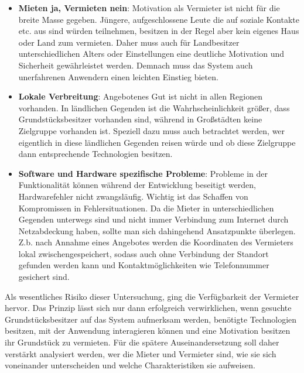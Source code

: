 \begin{itemize}
   \item
   \textbf{Mieten ja, Vermieten nein}: Motivation als Vermieter ist nicht für die breite Masse gegeben. Jüngere, aufgeschlossene Leute die auf soziale Kontakte etc. aus sind würden teilnehmen, besitzen in der Regel aber kein eigenes Haus oder Land zum vermieten. Daher muss auch für Landbesitzer unterschiedlichen Alters oder Einstellungen eine deutliche Motivation und Sicherheit gewährleistet werden. Demnach muss das System auch unerfahrenen Anwendern einen leichten Einstieg bieten.

   \item
   \textbf{Lokale Verbreitung}: Angebotenes Gut ist nicht in allen Regionen vorhanden. In ländlichen Gegenden ist die Wahrhscheinlichkeit größer, dass Grundstücksbesitzer vorhanden sind, während in Großstädten keine Zielgruppe vorhanden ist. Speziell dazu muss auch betrachtet werden, wer eigentlich in diese ländlichen Gegenden reisen würde und ob diese Zielgruppe dann entsprechende Technologien besitzen.

   \item
   \textbf{Software und Hardware spezifische Probleme}:
   Probleme in der Funktionalität können während der Entwicklung beseitigt werden, Hardwarefehler nicht zwangsläufig. Wichtig ist das Schaffen von Kompromissen in Fehlersituationen. 
   Da die Mieter in unterschiedlichen Gegenden unterwegs sind und nicht immer Verbindung zum Internet durch Netzabdeckung haben, sollte man sich dahingehend Ansatzpunkte überlegen. Z.b. nach Annahme eines Angebotes werden die Koordinaten des Vermieters lokal zwischengespeichert, sodass auch ohne Verbindung der Standort gefunden werden kann und Kontaktmöglichkeiten wie Telefonnummer gesichert sind.    
\end{itemize}

Als wesentliches Risiko dieser Untersuchung, ging die Verfügbarkeit der Vermieter hervor. Das Prinzip lässt sich nur dann erfolgreich verwirklichen, wenn gesuchte Grundstücksbesitzer auf das System aufmerksam werden, benötigte Technologien besitzen, mit der Anwendung interagieren können und eine Motivation besitzen ihr Grundstück zu vermieten. Für die spätere Auseinandersetzung soll daher verstärkt analysiert werden, wer die Mieter und Vermieter sind, wie sie sich voneinander unterscheiden und welche Charakteristiken sie aufweisen.
 